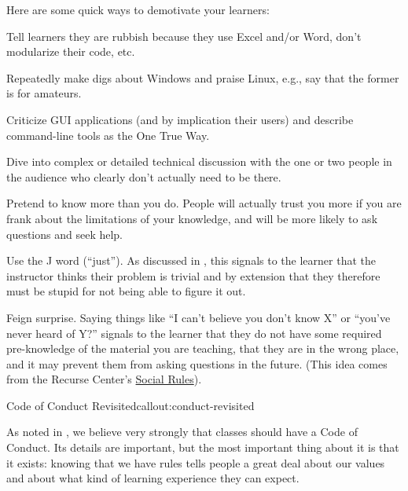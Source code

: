 Here are some quick ways to demotivate your learners:

\begin{gitemize}

\item
  Tell learners they are rubbish because they use Excel and/or Word,
  don't modularize their code, etc.

\item
  Repeatedly make digs about Windows and praise Linux, e.g., say that
  the former is for amateurs.

\item
  Criticize GUI applications (and by implication their users) and
  describe command-line tools as the One True Way.

\item
  Dive into complex or detailed technical discussion with the one or
  two people in the audience who clearly don't actually need to be
  there.

\item
  Pretend to know more than you do. People will actually trust you
  more if you are frank about the limitations of your knowledge, and
  will be more likely to ask questions and seek help.

\item
  Use the J word (``just''). As discussed in , this
  signals to the learner that the instructor thinks their problem is
  trivial and by extension that they therefore must be stupid for not
  being able to figure it out.

\item
  Feign surprise. Saying things like ``I can't believe you don't know
  X'' or ``you've never heard of Y?'' signals to the learner that they
  do not have some required pre-knowledge of the material you are
  teaching, that they are in the wrong place, and it may prevent them
  from asking questions in the future. (This idea comes from the
  Recurse Center's
  \href{https://www.recurse.com/manual\#sec-environment}{Social Rules}).

\end{gitemize}

\begin{callout}{Code of Conduct Revisited}{callout:conduct-revisited}

As noted in , we believe very strongly that
classes should have a Code of Conduct. Its details are important, but
the most important thing about it is that it exists: knowing that we
have rules tells people a great deal about our values and about what
kind of learning experience they can expect.

\end{callout}

